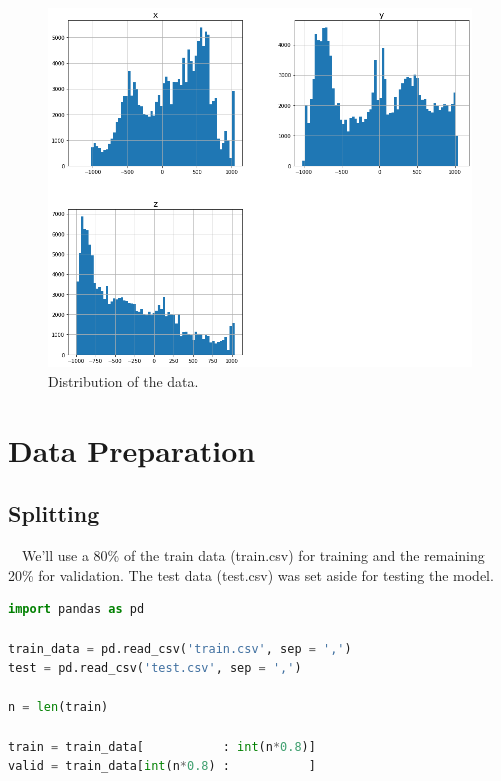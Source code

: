 \begin{figure}[H]
\centering
  \includegraphics[scale=0.4]{img/task_1/histograms.png}
  \caption{Distribution of the data.}
  \label{fig: histograms task 1 }
\end{figure}



\section*{Data Preparation}\label{Data Preparation}

\subsection*{Splitting}\label{Splitting}

~~We'll use a 80\% of the train data (train.csv) for training and the remaining 20\% for validation. The test data (test.csv) was set aside for testing the model.

\begin{lstlisting}[language=Python]
import pandas as pd

train_data = pd.read_csv('train.csv', sep = ',')
test = pd.read_csv('test.csv', sep = ',')

n = len(train)

train = train_data[           : int(n*0.8)]
valid = train_data[int(n*0.8) :           ]
\end{lstlisting}

